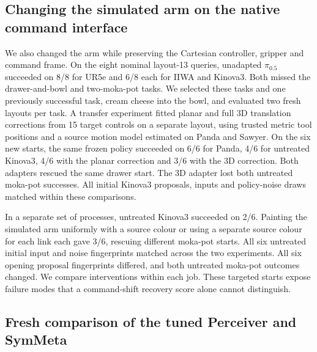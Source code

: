 \documentclass{article}
\theoremstyle{plain}
\theoremstyle{remark}
\begin{document}
\subsection{Changing the simulated arm on the native command interface}
\label{sec:native-interface}
We also changed the arm while preserving the Cartesian controller, gripper and command frame. On the eight nominal layout-13 queries, unadapted $\pi_{0.5}$ succeeded on 8/8 for UR5e and 6/8 each for IIWA and Kinova3. Both missed the drawer-and-bowl and two-moka-pot tasks. We selected these tasks and one previously successful task, cream cheese into the bowl, and evaluated two fresh layouts per task. A transfer experiment fitted planar and full 3D translation corrections from 15 target controls on a separate layout, using trusted metric tool positions and a source motion model estimated on Panda and Sawyer. On the six new starts, the same frozen policy succeeded on 6/6 for Panda, 4/6 for untreated Kinova3, 4/6 with the planar correction and 3/6 with the 3D correction. Both adapters rescued the same drawer start. The 3D adapter lost both untreated moka-pot successes. All initial Kinova3 proposals, inputs and policy-noise draws matched within these comparisons.

In a separate set of processes, untreated Kinova3 succeeded on 2/6. Painting the simulated arm uniformly with a source colour or using a separate source colour for each link each gave 3/6, rescuing different moka-pot starts. All six untreated initial input and noise fingerprints matched across the two experiments. All six opening proposal fingerprints differed, and both untreated moka-pot outcomes changed. We compare interventions within each job. These targeted starts expose failure modes that a command-shift recovery score alone cannot distinguish.

\subsection{Fresh comparison of the tuned Perceiver and SymMeta}
\end{document}
